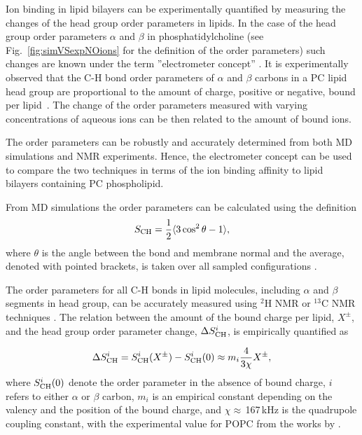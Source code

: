 Ion binding in lipid bilayers can be experimentally quantified
by measuring the changes of the head group order parameters in lipids.
In the case of the head group order parameters $\alpha$ and $\beta$ in phosphatidylcholine
(see Fig.~\ref{fig:simVSexpNOions} for the definition of the order parameters)
such changes are known under the term ''electrometer concept'' \citep{seelig87,catte16}. 
It is experimentally observed that the C-H bond
order parameters of $\alpha$ and $\beta$ carbons in a PC lipid head group
are proportional to the amount of charge, positive or negative, bound per lipid~\citep{seelig87}.
The change of the order parameters measured with varying concentrations of aqueous ions 
can be then related to the amount of bound ions.

The order parameters can be robustly and accurately determined from both MD simulations and  NMR experiments. 
Hence, the electrometer concept can be used to compare the two techniques
in terms of the ion binding affinity to lipid bilayers containing PC phospholipid.  \citep{catte16,ollila16} 

From MD simulations the order parameters can be calculated using the definition
\begin{equation}\label{OP} 
S_{\rm CH}=\frac{1}{2}\langle 3\cos^2\theta -1 \rangle, 
\end{equation} 
where $\theta$ is the angle between the bond and membrane
normal and the average, denoted with pointed brackets, is taken over all sampled configurations \citep{ollila16}.

The order parameters for all C-H bonds in lipid molecules, including
$\alpha$ and $\beta$ segments in head group, can be accurately measured
using $^2$H NMR or $^{13}$C NMR techniques \citep{ollila16}. 
The relation between the amount of the bound charge per lipid,  $X^\pm$, and
the head group order parameter change, $\Delta S_{\rm{CH}}^{i}$,
is empirically quantified as~\citep{seelig87,ferreira16}

\begin{equation}\label{OPchangeEQ} 
\Delta S_{\rm{CH}}^{i}= S_{\rm{CH}}^{i}(X^\pm)-S_{\rm{CH}}^{i}(0) \approx m_i \frac{4 }{3\chi}X^\pm, 
\end{equation} 
where $S_{\rm{CH}}^{i}(0)$ denote the order parameter in the absence of bound charge,
$i$ refers to either $\alpha$ or $\beta$ carbon,
$m_i$ is an empirical constant depending on the valency and the position of the bound charge,
and $\chi \approx$\,167\,kHz is the quadrupole coupling constant, 
with the experimental value for POPC from the works by \citet{seelig77,Davis83}.

